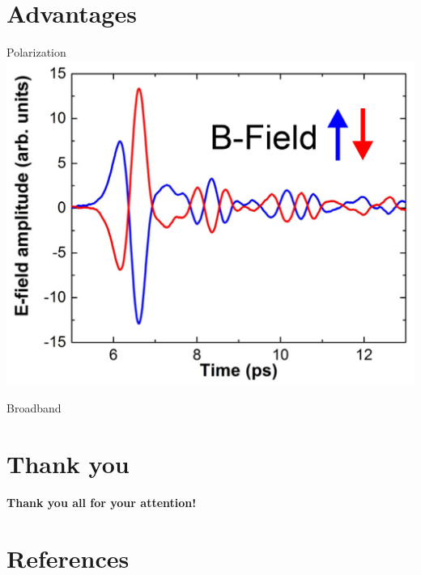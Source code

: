 \documentclass[aspectratio=1610, 9pt]{beamer}
\begin{document}
\section{Advantages}
\begin{frame}{Polarization}
\includegraphics[width=\textwidth]{pics/Bfeld.png}
\end{frame}

\begin{frame}{Broadband}
  
\end{frame}

\section*{Thank you}
\begin{frame}{}
  \begin{center}
  \textbf{\textcolor{tugreen}{Thank you all for your attention!}}
  \end{center}
\end{frame}

\section{References }
\printbibliography
\end{document}
